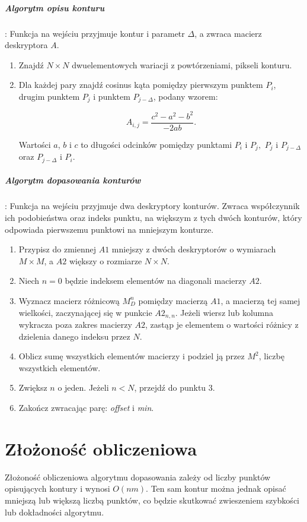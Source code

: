 \subparagraph{Algorytm opisu konturu}: Funkcja na wejściu przyjmuje kontur i
parametr $\Delta$, a zwraca macierz deskryptora $A$.  

\begin{enumerate} \item Znajdź $N \times N$ dwuelementowych wariacji z
    powtórzeniami, pikseli konturu. \item Dla każdej pary znajdź cosinus kąta
    pomiędzy pierwszym punktem $P_{i}$, drugim punktem $P_{j}$ i punktem
    $P_{j-\Delta}$, podany wzorem: 

\begin{equation}
  A_{i,j} = \frac{c^2 - a^2 - b^2}{-2ab}.
\end{equation}

 Wartości $a$, $b$ i $c$ to długości odcinków pomiędzy punktami $P_i$ i $P_j,$
 $P_j$ i $P_{j-\Delta}$ oraz $P_{j-\Delta}$ i $P_i$. \end{enumerate}

\subparagraph{Algorytm dopasowania konturów}: Funkcja na wejściu przyjmuje dwa
deskryptory konturów. Zwraca współczynnik ich podobieństwa oraz indeks punktu,
na większym z tych dwóch konturów, który odpowiada pierwszemu punktowi na
mniejszym konturze.

\begin{enumerate} \item Przypisz do zmiennej $A1$ mniejszy z dwóch deskryptorów
    o wymiarach $M \times M$, a $A2$ większy o rozmiarze $N \times N$. \item
    Niech $n = 0$ będzie indeksem elementów na diagonali macierzy $A2$. \item
    Wyznacz macierz różnicową $M_{D}^n$ pomiędzy macierzą $A1$, a macierzą tej
    samej wielkości, zaczynającej się w punkcie $A2_{n,n}$. Jeżeli wiersz lub
    kolumna wykracza poza zakres macierzy $A2$, zastąp je elementem o wartości
    różnicy z dzielenia danego indeksu przez $N$. \item Oblicz sumę wszystkich
    elementów macierzy i podziel ją przez $M^2$, liczbę wszystkich elementów.
  \item Zwiększ $n$ o jeden. Jeżeli $n < N$, przejdź do punktu 3. \item Zakończ
    zwracając parę: \textit{offset} i \textit{min}.  \end{enumerate}

\section{Złożoność obliczeniowa}

Złożoność obliczeniowa algorytmu dopasowania \cite{ismatch} zależy od liczby
punktów opisujących kontury i wynosi $O(nm)$. Ten sam kontur można jednak
opisać mniejszą lub większą liczbą punktów, co będzie skutkować zwieszeniem
szybkości lub dokładności algorytmu.

